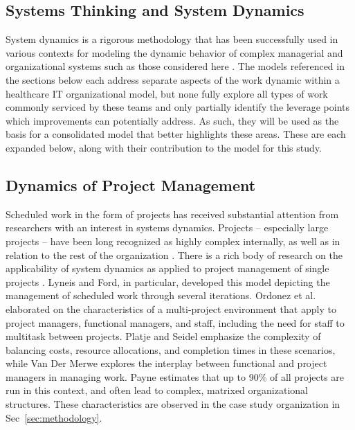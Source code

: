 \documentclass[conference]{IEEEtran}
\begin{document}
\subsection{Systems Thinking and System Dynamics}

System dynamics is a rigorous methodology that has been successfully used in various contexts for modeling the dynamic behavior of complex managerial and organizational systems such as those considered here \cite{jonkers_connecting_2021, abdel-hamid_dynamics_1984, groundstroem_using_2021, homer_system_2006}. The models referenced in the sections below each address separate aspects of the work dynamic within a healthcare IT organizational model, but none fully explore all types of work commonly serviced by these teams and only partially identify the leverage points which improvements can potentially address. As such, they will be used as the basis for a consolidated model that better highlights these areas. These are each expanded below, along with their contribution to the model for this study.

\subsection{Dynamics of Project Management}

Scheduled work in the form of projects has received substantial attention from researchers with an interest in systems dynamics. Projects -- especially large projects -- have been long recognized as highly complex internally, as well as in relation to the rest of the organization \cite{san_cristobal_complexity_2018, baccarini_concept_1996}. There is a rich body of research on the applicability of system dynamics as applied to project management of single projects \cite{lyneis_strategic_2001, rodrigues_system_1997, rodrigues_role_1996, abdel-hamid_lessons_1989}. Lyneis and Ford, in particular, developed this model depicting the management of scheduled work through several iterations\cite{lyneis_system_2007, ford_project_2007}. Ordonez et al.\cite{ordonez_study_2019} elaborated on the characteristics of a multi-project environment that apply to project managers, functional managers, and staff, including the need for staff to multitask between projects. Platje and Seidel\cite{platje_breakthrough_1993} emphasize the complexity of balancing costs, resource allocations, and completion times in these scenarios, while Van Der Merwe\cite{van_der_merwe_multi-project_1997} explores the interplay between functional and project managers in managing work. Payne estimates that up to 90\% of all projects are run in this context, and often lead to complex, matrixed organizational structures\cite{payne_management_1995}. These characteristics are observed in the case study organization in Sec~\ref{sec:methodology}.
\end{document}
